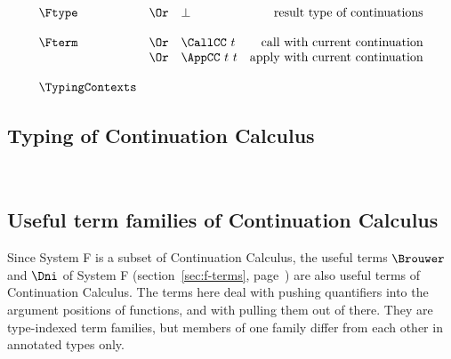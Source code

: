 \documentclass{amsart}
\begin{document}
\[
\begin{array}{lclr}
\Ftype
&\Or& \bot & \mbox{result type of continuations} \\
\\
\Fterm
&\Or& \CallCC~t & \mbox{call with current continuation} \\
&\Or& \AppCC~t~t & \mbox{apply with current continuation} \\
\\
\TypingContexts
\end{array}
\]

\subsection{Typing of Continuation Calculus}
~

\nc{}

\nc{}

\nc{}

\nc{}

\FRules

\DoubleNegationElimination

\ExistentialElimination

\subsection{Useful term families of Continuation Calculus}

Since System F is a subset of Continuation Calculus, the
useful terms $\Brouwer$ and $\Dni$ of System F
(section~\ref{sec:f-terms}, page~\pageref{sec:f-terms}) are also
useful terms of Continuation Calculus. The terms here deal
with pushing quantifiers into the argument positions of
functions, and with pulling them out of there. They are
type-indexed term families, but members of one family differ
from each other in annotated types only.
\end{document}
